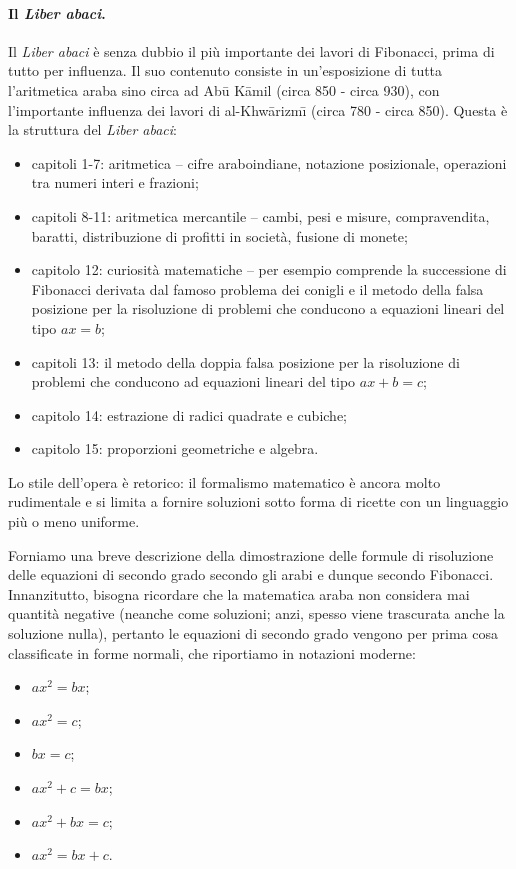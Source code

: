 \paragraph{Il \textit{Liber abaci}.} Il \textit{Liber abaci} \`e senza dubbio il pi\`u importante dei lavori di Fibonacci, prima di tutto per influenza. Il suo contenuto consiste in un'esposizione di tutta l'aritmetica araba sino circa ad Ab\=u K\=amil (circa 850 - circa 930), con l'importante influenza dei lavori di al-Khw\=arizm\={\i} (circa 780 - circa 850). Questa \`e la struttura del \textit{Liber abaci}:
\begin{itemize}
	\item capitoli 1-7: aritmetica -- cifre araboindiane, notazione posizionale, operazioni tra numeri interi e frazioni;
	\item capitoli 8-11: aritmetica mercantile -- cambi, pesi e misure, compravendita, baratti, distribuzione di profitti in societ\`a, fusione di monete;
	\item capitolo 12: curiosit\`a matematiche -- per esempio comprende la successione di Fibonacci derivata dal famoso problema dei conigli e il metodo della falsa posizione per la risoluzione di problemi che conducono a equazioni lineari del tipo $ax = b$;
	\item capitoli 13: il metodo della doppia falsa posizione per la risoluzione di problemi che conducono ad equazioni lineari del tipo $ax + b = c$;
	\item capitolo 14: estrazione di radici quadrate e cubiche;
	\item capitolo 15: proporzioni geometriche e algebra.
\end{itemize}
\par Lo stile dell'opera \`e retorico: il formalismo matematico \`e ancora molto rudimentale e si limita a fornire soluzioni sotto forma di ricette con un linguaggio pi\`u o meno uniforme.
\par Forniamo una breve descrizione della dimostrazione delle formule di risoluzione delle equazioni di secondo grado secondo gli arabi e dunque secondo Fibonacci. Innanzitutto, bisogna ricordare che la matematica araba non considera mai quantit\`a negative (neanche come soluzioni; anzi, spesso viene trascurata anche la soluzione nulla), pertanto le equazioni di secondo grado vengono per prima cosa classificate in forme normali, che riportiamo in notazioni moderne:
\begin{itemize}
	\item $ax^2 = bx$;
	\item $ax^2 = c$;
	\item $bx = c$;
	\item $ax^2 + c = bx$;
	\item $ax^2 + bx = c$;
	\item $ax^2 = bx + c$.
\end{itemize}
